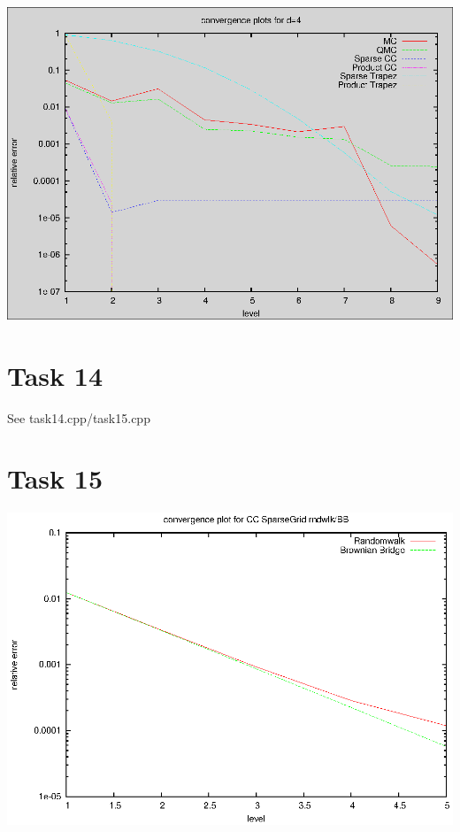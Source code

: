 \documentclass[]{article}
\begin{document}
\includegraphics{task13_d8}\\

\section*{Task 14}
See task14.cpp/task15.cpp

\section*{Task 15}
\includegraphics{task15}\\
\end{document}
